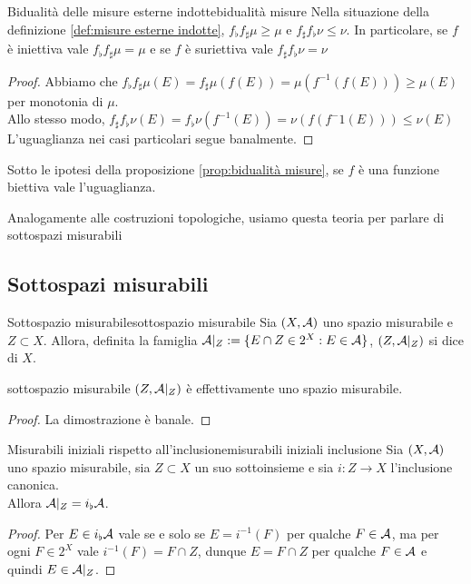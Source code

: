 \documentclass{article}
\renewcommand\A{\mc{A}}
\begin{document}
\begin{proposition}{Bidualità delle misure esterne indotte}{bidualità misure}
    Nella situazione della definizione \ref{def:misure esterne indotte}, $f_\flat f_\sharp\mu \ge \mu$ e $f_\sharp f_\flat\nu \le \nu$. In particolare, se $f$ è iniettiva vale $f_\flat f_\sharp\mu = \mu$ e se $f$ è suriettiva vale $f_\sharp f_\flat\nu = \nu$
    \begin{proof}
        Abbiamo che $f_\flat f_\sharp\mu(E) = f_\sharp\mu(f(E)) = \mu(f^{-1}(f(E)))\ge \mu(E)$ per monotonia di $\mu$.\\
        Allo stesso modo, $f_\sharp f_\flat\nu(E) = f_\flat\nu(f^{-1}(E)) = \nu(f(f^-1(E))) \le \nu(E)$\\
        L'uguaglianza nei casi particolari segue banalmente.
    \end{proof}
\end{proposition}
\begin{corollary}{}{}
    Sotto le ipotesi della proposizione \ref{prop:bidualità misure}, se $f$ è una funzione biettiva vale l'uguaglianza.
\end{corollary}

Analogamente alle costruzioni topologiche, usiamo questa teoria per parlare di sottospazi misurabili

\subsection{Sottospazi misurabili}

\begin{definition}{Sottospazio misurabile}{sottospazio misurabile}
    Sia $(X,\A)$ uno spazio misurabile e $Z\subset X$. Allora, definita la famiglia $\A|_Z := \{E\cap Z \in 2^X : E\in \A\}$, $(Z, \A|_Z)$ si dice  di $X$.
\end{definition}
\begin{remark}{}{sottospazio misurabile}
    $(Z,\A|_Z)$ è effettivamente uno spazio misurabile.
    \begin{proof}
        La dimostrazione è banale.
    \end{proof}
\end{remark}

\begin{proposition}{Misurabili iniziali rispetto all'inclusione}{misurabili iniziali inclusione}
    Sia $(X,\A)$ uno spazio misurabile, sia $Z\subset X$ un suo sottoinsieme e sia $i : Z \to X$ l'inclusione canonica.\\
    Allora $\A|_Z = i_\flat \A$.
    \begin{proof}
        Per $E \in i_\flat \A$ vale se e solo se $E = i^{-1}(F)$ per qualche $F \in \A$, ma per ogni $F \in 2^X$ vale $i^{-1}(F) = F \cap Z$, dunque $E = F\cap Z$ per qualche $F \in \A$ e quindi $E \in \A|_Z$.
    \end{proof}
\end{proposition}
\end{document}
